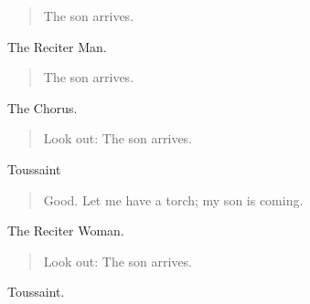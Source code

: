 \documentclass[letterpaper,article,12pt,oneside,notitlepage]{memoir}
\begin{document}
\begin{verse}
The son arrives. \\
\end{verse}

\begin{center}The Reciter Man.\end{center}

\begin{verse}
The son arrives. \\
\end{verse}

\begin{center}The Chorus.\end{center}

\begin{verse}
Look out: The son arrives. \\
\end{verse}

\begin{center}Toussaint\end{center}

\begin{verse}
Good. Let me have a torch; my son is coming. \\
\end{verse}

\begin{center}The Reciter Woman.\end{center}

\begin{verse}
Look out: The son arrives. \\
\end{verse}

\begin{center}Toussaint.\end{center}
\end{document}
